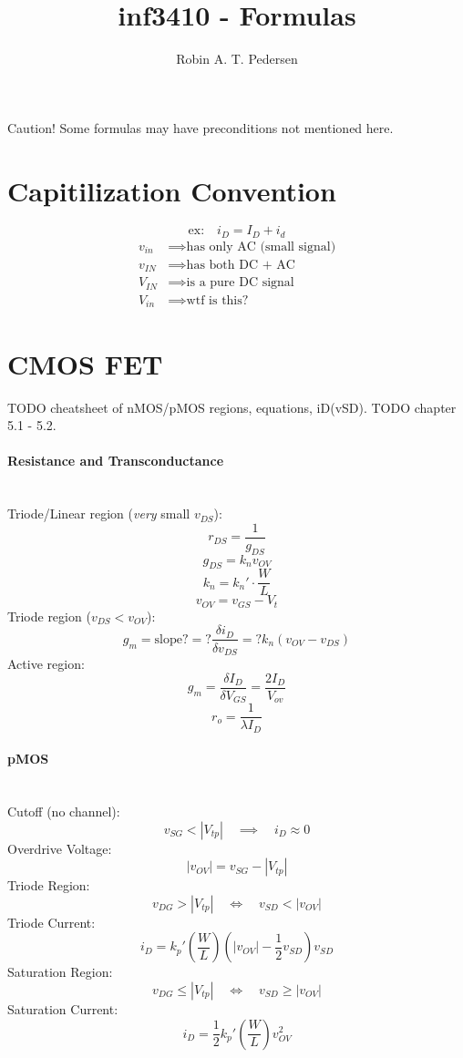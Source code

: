 \documentclass[twocolumn]{article}
\begin{document}
  \title{inf3410 - Formulas}
  \author{Robin A. T. Pedersen}
  \maketitle

  Caution! Some formulas may have preconditions not mentioned here.

  \section{Capitilization Convention}
    $$\text{ex:}\quad i_D = I_D + i_d$$
    \begin{align}
      v_{in} &\implies \text{has only AC (small signal)} \\
      v_{IN} &\implies \text{has both DC + AC} \\
      V_{IN} &\implies \text{is a pure DC signal} \\
      V_{in} &\implies \text{wtf is this?}
    \end{align}

  \section{CMOS FET}
    TODO cheatsheet of nMOS/pMOS regions, equations, iD(vSD).
    TODO chapter 5.1 - 5.2.

    \paragraph{Resistance and Transconductance} \hfill \\
      Triode/Linear region (\emph{very} small $v_{DS}$):
        $$r_{DS} = \frac{1}{g_{DS}}$$
        $$g_{DS} = k_n v_{OV}$$
        $$k_n = k_n' \cdot \frac{W}{L}$$
        $$v_{OV} = v_{GS} - V_t$$
      Triode region ($v_{DS} < v_{OV}$):
        $$g_m = \text{slope?}
          = ?\frac{\delta i_D}{\delta v_{DS}}
          = ? k_n (v_{OV} - v_{DS})
          $$
      Active region:
        $$g_m = \frac{\delta I_D}{\delta V_{GS}} = \frac{2 I_D}{V_{ov}}$$
        $$r_o = \frac{1}{\lambda I_D}$$

    \paragraph{pMOS} \hfill \\
      Cutoff (no channel):
        $$v_{SG} < |V_{tp}| \quad\implies\quad i_D \approx 0$$
      Overdrive Voltage:
        $$|v_{OV}| = v_{SG} - |V_{tp}|$$
      Triode Region:
        $$v_{DG} > |V_{tp}| \quad\Leftrightarrow\quad v_{SD} < |v_{OV}|$$
      Triode Current:
        $$i_D = k_p' \left( \frac{W}{L} \right)
                     \left( |v_{OV}| - \frac{1}{2} v_{SD} \right) v_{SD}$$
      Saturation Region:
        $$v_{DG} \leq |V_{tp}| \quad\Leftrightarrow\quad v_{SD} \geq |v_{OV}|$$
      Saturation Current:
        $$i_D = \frac{1}{2} k_p' \left( \frac{W}{L} \right) v_{OV}^2$$
\end{document}
